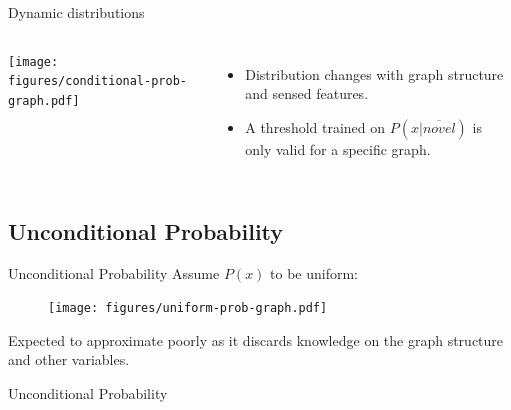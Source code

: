 \documentclass[compress]{beamer}
\begin{document}
\begin{frame}{Dynamic distributions}
    \begin{columns}[c]
        \centering
        \texttt{[image: figures/conditional-prob-graph.pdf]}

        \begin{itemize}
            \item Distribution changes with graph structure and sensed features.
            \item A threshold trained on $P(x|\overline{novel})$ is only valid for a specific
                graph.
        \end{itemize}
    \end{columns}
    \begin{center}
    \end{center}
\end{frame}

\subsection{Unconditional Probability}
\begin{frame}{Unconditional Probability}
    Assume $P(x)$ to be uniform:
    \vfill
    \begin{figure}
        \centering
        \texttt{[image: figures/uniform-prob-graph.pdf]}
    \end{figure}
    \vfill
    Expected to approximate poorly as it discards knowledge on the graph structure and other variables.
\end{frame}

\begin{frame}{Unconditional Probability}
\end{frame}
\end{document}
